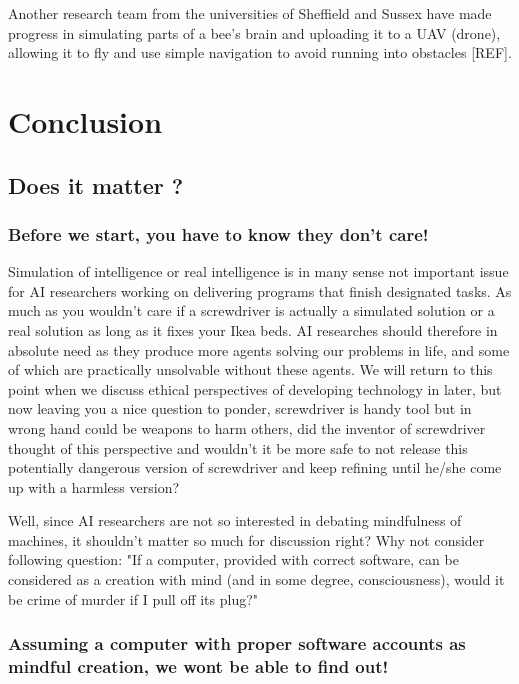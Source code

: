 \documentclass[11pt]{article}
\begin{document}
Another research team from the universities of Sheffield and Sussex have made progress in simulating parts of a bee's brain and uploading it to a UAV (drone), allowing it to fly and use simple navigation to avoid running into obstacles [REF].



\section{Conclusion}
\label{sec:conclusion}

\subsection{Does it matter ?}

\subsubsection{Before we start, you have to know they don’t care!}

Simulation of intelligence or real intelligence is in many sense not important issue for AI researchers working on delivering programs that finish designated tasks. As much as you wouldn't care if a screwdriver is actually a simulated solution or a real solution as long as it fixes your Ikea beds. AI researches should therefore in absolute need as they produce more agents solving our problems in life, and some of which are practically unsolvable without these agents. We will return to this point when we discuss ethical perspectives of developing technology in later, but now leaving you a nice question to ponder, screwdriver is handy tool but in wrong hand could be weapons to harm others, did the inventor of screwdriver thought of this perspective and wouldn’t it be more safe to not release this potentially dangerous version of screwdriver and keep refining until he/she come up with a harmless version?
  
Well, since AI researchers are not so interested in debating mindfulness of machines, it shouldn't matter so much for discussion right? Why not consider following question: "If a computer, provided with correct software, can be considered as a creation with mind (and in some degree, consciousness), would it be crime of murder if I pull off its plug?"

\subsubsection{Assuming a computer with proper software accounts as mindful creation, we wont be able to find out!}
\end{document}
